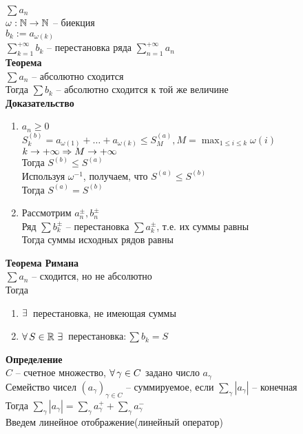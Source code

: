 \documentclass[12pt]{article}
\begin{document}
\begin{enumerate}
    $\sum a_n$\\
    $\omega: \mathbb{N} \rightarrow \mathbb{N}$ -- биекция\\
    $b_k := a_{\omega(k)}$\\
    $\sum_{k=1}^{+\infty} b_k$ -- перестановка ряда $\sum_{n=1}^{+\infty} a_n$\\
    \textbf{Теорема}\\
    $\sum a_n$ -- абсолютно сходится\\
    Тогда $\sum b_k$ -- абсолютно сходится к той же величине\\
    \textbf{Доказательство}
    \begin{enumerate}
        \item $a_n \geq 0$\\
        $S_k^{(b)} = a_{\omega(1)} + \ldots + a_{\omega(k)} \leq S_M^{(a)}, M = \max_{1 \leq i \leq k} \omega(i)$\\
        $k\rightarrow +\infty \Rightarrow M \rightarrow +\infty$\\
        Тогда $S^{(b)} \leq S^{(a)}$\\
        Используя $\omega^{-1}$, получаем, что $S^{(a)} \leq S^{(b)}$\\
        Тогда $S^{(a)} = S^{(b)}$
        \item Рассмотрим $a_n^\pm, b_n^\pm$\\
        Ряд $\sum b_k^\pm$ -- перестановка $\sum a_k^\pm$, т.е. их суммы равны\\
        Тогда суммы исходных рядов равны
    \end{enumerate}
    \textbf{Теорема Римана}\\
    $\sum a_n$ -- сходится, но не абсолютно\\
    Тогда \begin{enumerate}
        \item $\exists\,$ перестановка, не имеющая суммы
        \item $\forall\, S \in \mathbb{R}\ \exists\, $ перестановка$: \sum b_k = S$
    \end{enumerate}
\end{enumerate}
\textbf{Определение}\\
$C$ -- счетное множество, $\forall\, \gamma \in C$ задано число $a_\gamma$\\
Семейство чисел $(a_\gamma)_{\gamma \in C}$ -- суммируемое, если $\sum_{\gamma} |a_\gamma|$ -- конечная\\
Тогда $\sum_\gamma |a_\gamma| = \sum_\gamma a^+_\gamma + \sum_\gamma a^-_\gamma$\\
Введем линейное отображение(линейный оператор)\\
\end{document}
